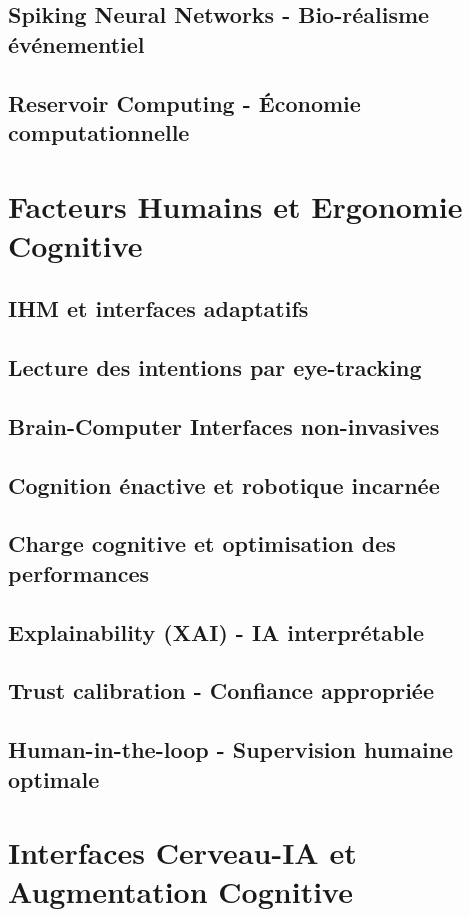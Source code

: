 \documentclass[12pt,a4paper]{book}
\begin{document}
\section{Spiking Neural Networks - Bio-réalisme événementiel}
\section{Reservoir Computing - Économie computationnelle}

\chapter{Facteurs Humains et Ergonomie Cognitive}
\section{IHM et interfaces adaptatifs}
\section{Lecture des intentions par eye-tracking}
\section{Brain-Computer Interfaces non-invasives}
\section{Cognition énactive et robotique incarnée}
\section{Charge cognitive et optimisation des performances}
\section{Explainability (XAI) - IA interprétable}
\section{Trust calibration - Confiance appropriée}
\section{Human-in-the-loop - Supervision humaine optimale}

\chapter{Interfaces Cerveau-IA et Augmentation Cognitive}
\end{document}
